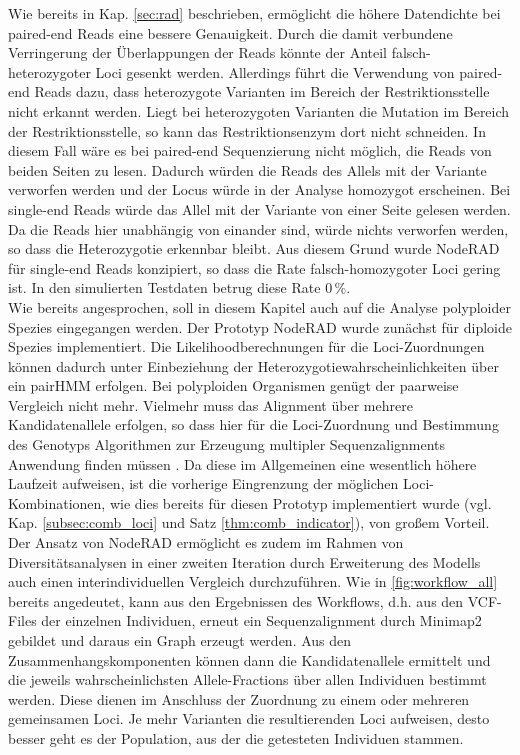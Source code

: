 Wie bereits in Kap. \ref{sec:rad} beschrieben, ermöglicht die höhere Datendichte bei paired-end Reads eine bessere Genauigkeit. Durch die damit verbundene Verringerung der Überlappungen der Reads könnte der Anteil falsch-heterozygoter Loci gesenkt werden. Allerdings führt die Verwendung von paired-end Reads dazu, dass heterozygote Varianten im Bereich der Restriktionsstelle nicht erkannt werden. Liegt bei heterozygoten Varianten die Mutation im Bereich der Restriktionsstelle, so kann das Restriktionsenzym dort nicht schneiden. In diesem Fall wäre es bei paired-end Sequenzierung nicht möglich, die Reads von beiden Seiten zu lesen. Dadurch würden die Reads des Allels mit der Variante verworfen werden und der Locus würde in der Analyse homozygot erscheinen. Bei single-end Reads würde das Allel mit der Variante von einer Seite gelesen werden. Da die Reads hier unabhängig von einander sind, würde nichts verworfen werden, so dass die Heterozygotie erkennbar bleibt. Aus diesem Grund wurde NodeRAD für single-end Reads konzipiert, so dass die Rate falsch-homozygoter Loci gering ist. In den simulierten Testdaten betrug diese Rate $0 \, \%$. \\

Wie bereits angesprochen, soll in diesem Kapitel auch auf die Analyse polyploider Spezies eingegangen werden. Der Prototyp NodeRAD wurde zunächst für diploide Spezies implementiert. Die Likelihoodberechnungen für die Loci-Zuordnungen können dadurch unter Einbeziehung der Heterozygotiewahrscheinlichkeiten über ein pairHMM erfolgen. Bei polyploiden Organismen genügt der paarweise Vergleich nicht mehr. Vielmehr muss das Alignment über mehrere Kandidatenallele erfolgen, so dass hier für die Loci-Zuordnung und Bestimmung des Genotyps Algorithmen zur Erzeugung multipler Sequenzalignments Anwendung finden müssen \cite{chowdhury_2017,bawono_2017,chatzou_2015}. Da diese im Allgemeinen eine wesentlich höhere Laufzeit aufweisen, ist die vorherige Eingrenzung der möglichen Loci-Kombinationen, wie dies bereits für diesen Prototyp implementiert wurde (vgl. Kap. \ref{subsec:comb_loci} und Satz \ref{thm:comb_indicator}), von großem Vorteil. \\

Der Ansatz von NodeRAD ermöglicht es zudem im Rahmen von Diversitätsanalysen in einer zweiten Iteration durch Erweiterung des Modells auch einen interindividuellen Vergleich durchzuführen. Wie in \autoref{fig:workflow_all} bereits angedeutet, kann aus den Ergebnissen des Workflows, d.h. aus den VCF-Files der einzelnen Individuen, erneut ein Sequenzalignment durch Minimap2 gebildet und daraus ein Graph erzeugt werden. Aus den Zusammenhangskomponenten können dann die Kandidatenallele ermittelt und die jeweils wahrscheinlichsten Allele-Fractions über allen Individuen bestimmt werden. Diese dienen im Anschluss der Zuordnung zu einem oder mehreren gemeinsamen Loci. Je mehr Varianten die resultierenden Loci aufweisen, desto besser geht es der Population, aus der die getesteten Individuen stammen.\\

\let\cleardoublepage\clearpage